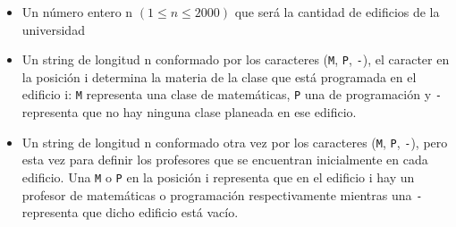 \documentclass[11pt]{article}
\begin{document}
    \begin{itemize}
        \item Un número entero  n $(1 \leq n \leq 2000)$ que será la cantidad de edificios de la universidad
        \item Un string de longitud n conformado por los caracteres (\texttt{M}, \texttt{P}, \texttt{-}), el caracter
              en la posición i determina la materia de la clase que está programada en el edificio i: \texttt{M} representa
              una clase de matemáticas, \texttt{P} una de programación y \texttt{-} representa que no hay ninguna
              clase planeada en ese edificio.
        \item Un string de longitud n conformado otra vez por los caracteres (\texttt{M}, \texttt{P}, \texttt{-}),
              pero esta vez para definir los profesores que se encuentran inicialmente en cada edificio. Una \texttt{M}
              o \texttt{P} en la posición i representa que en el edificio i hay un profesor de matemáticas o programación
              respectivamente mientras una \texttt{-} representa que dicho edificio está vacío.
    \end{itemize}
    
\end{document}
